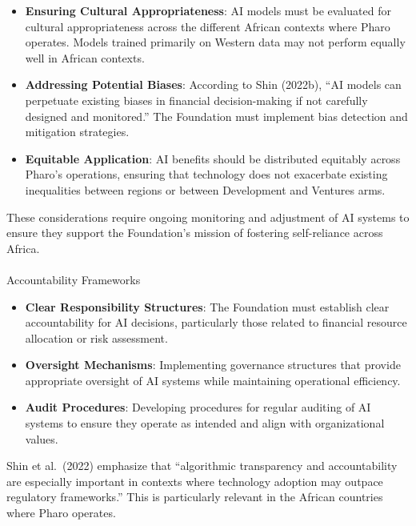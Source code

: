 \documentclass[
]{article}
\makeatletter
\let\oldparagraph\paragraph
\renewcommand{\paragraph}{
    \@ifstar
      \xxxParagraphStar
      \xxxParagraphNoStar
  }
\newcommand{\xxxParagraphStar}[1]{\oldparagraph*{#1}\mbox{}}
\newcommand{\xxxParagraphNoStar}[1]{\oldparagraph{#1}\mbox{}}
\makeatother
\begin{document}
\begin{itemize}
\item
  \textbf{Ensuring Cultural Appropriateness}: AI models must be
  evaluated for cultural appropriateness across the different African
  contexts where Pharo operates. Models trained primarily on Western
  data may not perform equally well in African contexts.
\item
  \textbf{Addressing Potential Biases}: According to Shin (2022b), ``AI
  models can perpetuate existing biases in financial decision-making if
  not carefully designed and monitored.'' The Foundation must implement
  bias detection and mitigation strategies.
\item
  \textbf{Equitable Application}: AI benefits should be distributed
  equitably across Pharo's operations, ensuring that technology does not
  exacerbate existing inequalities between regions or between
  Development and Ventures arms.
\end{itemize}

These considerations require ongoing monitoring and adjustment of AI
systems to ensure they support the Foundation's mission of fostering
self-reliance across Africa.

\paragraph{Accountability Frameworks}\label{accountability-frameworks}

\begin{itemize}
\item
  \textbf{Clear Responsibility Structures}: The Foundation must
  establish clear accountability for AI decisions, particularly those
  related to financial resource allocation or risk assessment.
\item
  \textbf{Oversight Mechanisms}: Implementing governance structures that
  provide appropriate oversight of AI systems while maintaining
  operational efficiency.
\item
  \textbf{Audit Procedures}: Developing procedures for regular auditing
  of AI systems to ensure they operate as intended and align with
  organizational values.
\end{itemize}

Shin et al.~(2022) emphasize that ``algorithmic transparency and
accountability are especially important in contexts where technology
adoption may outpace regulatory frameworks.'' This is particularly
relevant in the African countries where Pharo operates.
\end{document}
